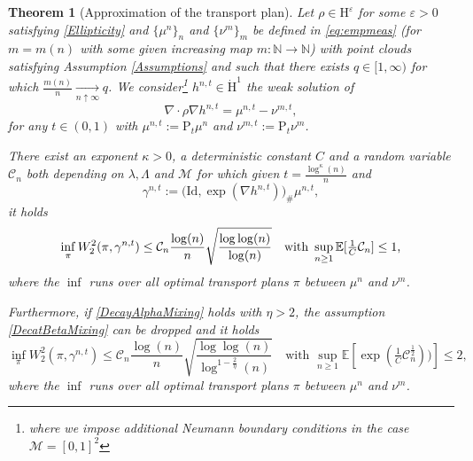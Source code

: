 \documentclass[11pt,a4paper,oneside]{amsart}
\numberwithin{equation}{section}
\newtheorem{theorem}{Theorem}[section]
\newcommand{\LL}{\mathrm{L}}
\newcommand{\pp}{\mathrm{P}}
\newcommand{\nc}[1]{\textcolor{red}{[N: #1]}}
\begin{document}
\begin{theorem}[Approximation of the transport plan]\label{MainResultMatchingClouds}
%
Let $\rho\in \mathrm{H}^{\varepsilon}$ for some $\varepsilon>0$ satisfying \eqref{Ellipticity} and $\{\mu^n\}_n$ and $\{\nu^{m}\}_m$ be defined in \eqref{eq:empmeas} (for $m=m(n)$ with some given increasing map $m:\mathbb{N}\rightarrow\mathbb{N}$) with point clouds satisfying Assumption \ref{Assumptions} and such that there exists $q\in [1,\infty)$ for which $\frac{m(n)}{n}\underset{n\uparrow\infty}{\rightarrow} q$. We consider\footnote{where we impose additional Neumann boundary conditions in the case $\mathcal{M}=[0,1]^2$} $h^{n,t}\in \dot{\mathrm{H}}^1$ the weak solution of
%
\begin{equation}\label{eq:f^nmt}
\nabla\cdot \rho\nabla h^{n,t} =\mu^{n,t}-\nu^{m,t},
\end{equation}
%
for any $t\in(0,1)$ with $\mu^{n,t}:=\pp_t\mu^n$ and $\nu^{m,t}:=\pp_t\nu^m$.

%
\medskip
%

There exist an exponent $\kappa>0$, a deterministic constant $C$ and a random variable $\mathcal{C}_n$ both depending on $\lambda, \Lambda$ and $\mathcal{M}$ for which given $t=\frac{\log^{\kappa}(n)}{n}$ and
%
\begin{equation}\label{DefApproxPlan}
%
\gamma^{n,t}:=\big(\mathrm{Id},\exp(\nabla h^{n,t})\big)_\#\mu^{n,t},
%
\end{equation}
%
it holds
%
\begin{equation}\label{ApproximationTransportPlan}
\inf_{\pi}W^2_2(\pi,\gamma^{n,t})\leq \mathcal{C}_n\frac{\log(n)}{n}\sqrt{\frac{\log\log(n)}{\log(n)}}\quad\text{with \,$\sup_{n\geq 1}\mathbb{E}[\tfrac{1}{C}\mathcal{C}_n]\leq 1$,}
\end{equation}
%
where the $\inf$ runs over all optimal transport plans $\pi$ between $\mu^n$ and $\nu^m$.

%
\medskip
%

Furthermore, if \eqref{DecayAlphaMixing} holds with $\eta>2$, the assumption \eqref{DecatBetaMixing} can be dropped and it holds
%
\begin{equation}\label{ApproximationTransportPlanBis}
%
\inf_{\pi}W^2_2(\pi,\gamma^{n,t})\leq \mathcal{C}_n\frac{\log(n)}{n}\sqrt{\frac{\log\log(n)}{\log^{1-\frac{2}{\eta}}(n)}}\quad\text{with }\sup_{n\geq 1}\mathbb{E}[\exp(\tfrac{1}{C}\mathcal{C}^{\frac{1}{2}}_n))]\leq 2,
%
\end{equation}
where the $\inf$ runs over all optimal transport plans $\pi$ between $\mu^n$ and $\nu^m$.
%
%
\end{theorem}
\end{document}
